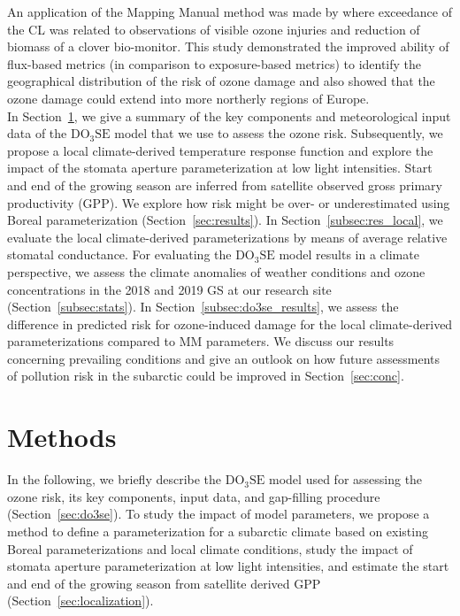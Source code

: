 \documentclass[bg, manuscript]{copernicus}
\begin{document}
An application of the Mapping Manual method was made by \citet{GCB:Mills2011} where exceedance of the CL was related to observations of visible ozone injuries and reduction of biomass of a clover bio-monitor. This study demonstrated the improved ability of flux-based metrics (in comparison to exposure-based metrics) to identify the geographical distribution of the risk of ozone damage and also showed that the ozone damage could extend into more northerly regions of Europe.\\

In Section~\ref{sec:dam}, we give a summary of the key components and meteorological input data of the $\mathrm{DO_3SE}$ model that we use to assess the ozone risk. Subsequently, we propose a local climate-derived temperature response function and explore the impact of the stomata aperture parameterization at low light intensities. Start and end of the growing season are inferred from satellite observed gross primary productivity (GPP). We explore how risk might be over- or underestimated using Boreal parameterization (Section~\ref{sec:results}). In Section~\ref{subsec:res_local}, we evaluate the local climate-derived parameterizations by means of average relative stomatal conductance. For evaluating the $\mathrm{DO_3SE}$ model results in a climate perspective, we assess the climate anomalies of weather conditions and ozone concentrations in the 2018 and 2019 GS at our research site (Section~\ref{subsec:stats}). In Section~\ref{subsec:do3se_results}, we assess the difference in predicted risk for ozone-induced damage for the local climate-derived parameterizations compared to MM parameters. We discuss our results concerning prevailing conditions and give an outlook on how future assessments of pollution risk in the subarctic could be improved in Section~\ref{sec:conc}.

\section{Methods}
\label{sec:dam}
In the following, we briefly describe the $\mathrm{DO_3SE}$ model used for assessing the ozone risk, its key components, input data, and gap-filling procedure (Section~\ref{sec:do3se}). To study the impact of model parameters, we propose a method to define a parameterization for a subarctic climate based on existing Boreal parameterizations and local climate conditions, study the impact of stomata aperture parameterization at low light intensities, and estimate the start and end of the growing season from satellite derived GPP (Section~\ref{sec:localization}).
\end{document}
